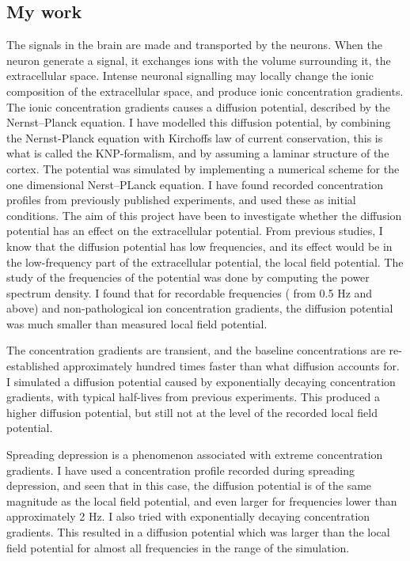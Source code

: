 \documentclass{article}
\begin{document}
\subsection{My work}
The signals in the brain are made and transported by the neurons. When the neuron generate a signal, it exchanges ions with the volume surrounding it, the extracellular space. Intense neuronal signalling may locally change the ionic composition of the extracellular space, and produce ionic concentration gradients. The ionic concentration gradients causes a diffusion potential, described by the Nernst--Planck equation. I have modelled this diffusion potential, by combining the Nernst-Planck equation with Kirchoffs law of current conservation, this is what is called the KNP-formalism, and by assuming a laminar structure of the cortex. The potential was simulated by implementing a numerical scheme for the one dimensional Nerst--PLanck equation. I have found recorded concentration profiles from previously published experiments, and used these as initial conditions. The aim of this project have been to investigate whether the diffusion potential has an effect on the extracellular potential. From previous studies, I know that the diffusion potential has low frequencies, and its effect would be in the low-frequency part of the extracellular potential, the local field potential. The study of the frequencies of the potential was done by computing the power spectrum density. I found that for recordable frequencies ( from 0.5 Hz and above) and non-pathological ion concentration gradients, the diffusion potential was much smaller than measured local field potential. 

The concentration gradients are transient, and the baseline concentrations are re-established approximately hundred times faster than what diffusion accounts for. I simulated a diffusion potential caused by exponentially decaying concentration gradients, with typical half-lives from previous experiments. This produced a higher diffusion potential, but still not at the level of the recorded local field potential. 

Spreading depression is a phenomenon associated with extreme concentration gradients. I have used a concentration profile recorded during spreading depression, and seen that in this case, the diffusion potential is of the same magnitude as the local field potential, and even larger for frequencies lower than approximately 2 Hz. I also tried with exponentially decaying concentration gradients. This resulted in a diffusion potential which was larger than the local field potential for almost all frequencies in the range of the simulation. 
\end{document}
